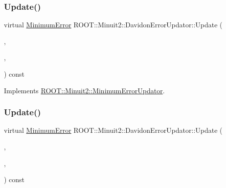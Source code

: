 \subsubsection{\texorpdfstring{Update()}{Update()}\hspace{0.1cm}{\footnotesize\ttfamily [2/3]}}
{\footnotesize\ttfamily virtual \mbox{\hyperlink{classROOT_1_1Minuit2_1_1MinimumError}{Minimum\+Error}} R\+O\+O\+T\+::\+Minuit2\+::\+Davidon\+Error\+Updator\+::\+Update (\begin{DoxyParamCaption}\item[{const \mbox{\hyperlink{classROOT_1_1Minuit2_1_1MinimumState}{Minimum\+State}} \&}]{,  }\item[{const \mbox{\hyperlink{classROOT_1_1Minuit2_1_1MinimumParameters}{Minimum\+Parameters}} \&}]{,  }\item[{const \mbox{\hyperlink{classROOT_1_1Minuit2_1_1FunctionGradient}{Function\+Gradient}} \&}]{ }\end{DoxyParamCaption}) const\hspace{0.3cm}{\ttfamily [virtual]}}



Implements \mbox{\hyperlink{classROOT_1_1Minuit2_1_1MinimumErrorUpdator_ae75c33152c49ebf34e6119adc0bbbda9}{R\+O\+O\+T\+::\+Minuit2\+::\+Minimum\+Error\+Updator}}.

\mbox{\label{classROOT_1_1Minuit2_1_1DavidonErrorUpdator_aae088602f78dc3bee91f7ce2534311e9}} 
\subsubsection{\texorpdfstring{Update()}{Update()}\hspace{0.1cm}{\footnotesize\ttfamily [3/3]}}
{\footnotesize\ttfamily virtual \mbox{\hyperlink{classROOT_1_1Minuit2_1_1MinimumError}{Minimum\+Error}} R\+O\+O\+T\+::\+Minuit2\+::\+Davidon\+Error\+Updator\+::\+Update (\begin{DoxyParamCaption}\item[{const \mbox{\hyperlink{classROOT_1_1Minuit2_1_1MinimumState}{Minimum\+State}} \&}]{,  }\item[{const \mbox{\hyperlink{classROOT_1_1Minuit2_1_1MinimumParameters}{Minimum\+Parameters}} \&}]{,  }\item[{const \mbox{\hyperlink{classROOT_1_1Minuit2_1_1FunctionGradient}{Function\+Gradient}} \&}]{ }\end{DoxyParamCaption}) const\hspace{0.3cm}{\ttfamily [virtual]}}



